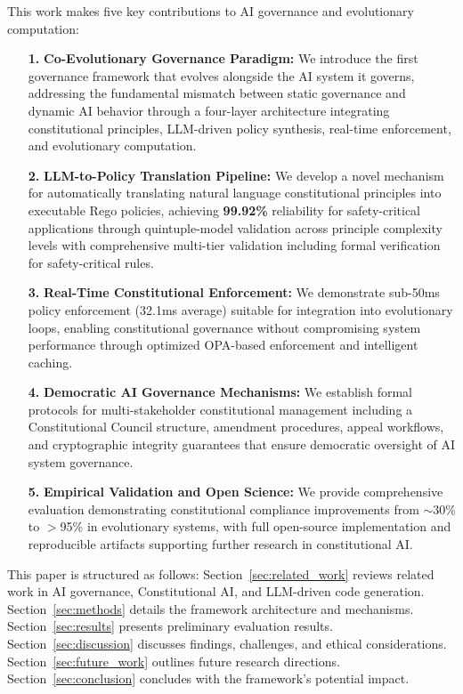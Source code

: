 \documentclass[manuscript,screen,review,anonymous,9pt]{acmart}
\begin{document}
This work makes five key contributions to AI governance and evolutionary computation:
\begin{itemize}
    \item[\textbf{1.}] \textbf{Co-Evolutionary Governance Paradigm:} We introduce the first governance framework that evolves alongside the AI system it governs, addressing the fundamental mismatch between static governance and dynamic AI behavior through a four-layer architecture integrating constitutional principles, LLM-driven policy synthesis, real-time enforcement, and evolutionary computation.
    \item[\textbf{2.}] \textbf{LLM-to-Policy Translation Pipeline:} We develop a novel mechanism for automatically translating natural language constitutional principles into executable Rego policies, achieving \textbf{99.92\%} reliability for safety-critical applications through quintuple-model validation across principle complexity levels with comprehensive multi-tier validation including formal verification for safety-critical rules.
    \item[\textbf{3.}] \textbf{Real-Time Constitutional Enforcement:} We demonstrate sub-50ms policy enforcement (32.1ms average) suitable for integration into evolutionary loops, enabling constitutional governance without compromising system performance through optimized OPA-based enforcement and intelligent caching.
    \item[\textbf{4.}] \textbf{Democratic AI Governance Mechanisms:} We establish formal protocols for multi-stakeholder constitutional management including a Constitutional Council structure, amendment procedures, appeal workflows, and cryptographic integrity guarantees that ensure democratic oversight of AI system governance.
    \item[\textbf{5.}] \textbf{Empirical Validation and Open Science:} We provide comprehensive evaluation demonstrating constitutional compliance improvements from $\sim$30\% to $>$95\% in evolutionary systems, with full open-source implementation and reproducible artifacts supporting further research in constitutional AI.
\end{itemize}

This paper is structured as follows: Section~\ref{sec:related_work} reviews related work in AI governance, Constitutional AI, and LLM-driven code generation. Section~\ref{sec:methods} details the framework architecture and mechanisms. Section~\ref{sec:results} presents preliminary evaluation results. Section~\ref{sec:discussion} discusses findings, challenges, and ethical considerations. Section~\ref{sec:future_work} outlines future research directions. Section~\ref{sec:conclusion} concludes with the framework's potential impact.
\end{document}
